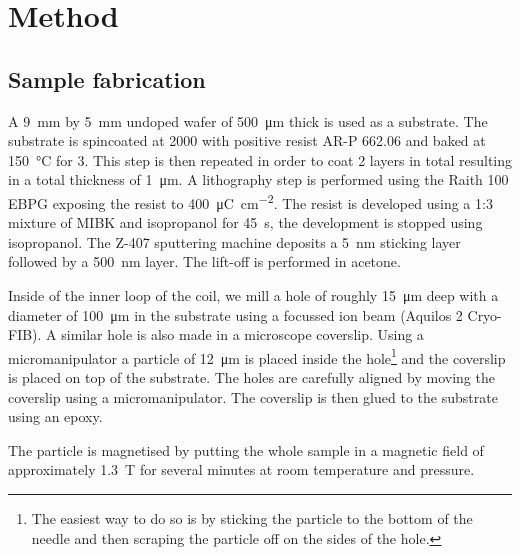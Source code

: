 \chapter{Method}
\label{chap:method}

\section{Sample fabrication}
\label{sec:sample-fabrication}
A \qty{9}{\mm} by \qty{5}{\mm} undoped  wafer of \qty{500}{\um} thick is used as a substrate. The substrate is spincoated at \qty{2000}{\rpm} with positive resist AR-P 662.06 and baked at \qty{150}{\celsius} for \qty{3}{\min}. This step is then repeated in order to coat 2 layers in total resulting in a total thickness of \qty{1}{\um}. A lithography step is performed using the Raith 100 EBPG exposing the resist to \qty{400}{\micro\coulomb\per\square\cm}. The resist is developed using a 1:3 mixture of MIBK and isopropanol for \qty{45}{\s}, the development is stopped using isopropanol. The Z-407 sputtering machine deposits a \qty{5}{\nm}  sticking layer followed by a \qty{500}{\nm}  layer. The lift-off is performed in acetone.

Inside of the inner loop of the coil, we mill a hole of roughly \qty{15}{\um} deep with a diameter of \qty{100}{\um} in the  substrate using a  focussed ion beam (Aquilos 2 Cryo-FIB). A similar hole is also made in a microscope coverslip. Using a micromanipulator a  particle of \qty{12}{\um} is placed inside the  hole\footnote{The easiest way to do so is by sticking the particle to the bottom of the needle and then scraping the particle off on the sides of the  hole.} and the coverslip is placed on top of the  substrate. The holes are carefully aligned by moving the coverslip using a micromanipulator. The coverslip is then glued to the  substrate using an epoxy.

The particle is magnetised by putting the whole sample in a magnetic field of approximately \qty{1.3}{\tesla} for several minutes at room temperature and pressure.

